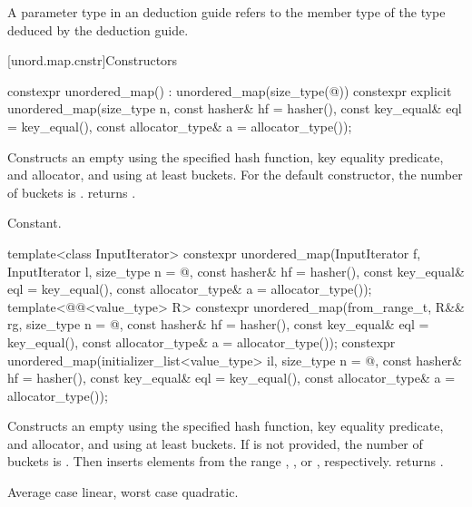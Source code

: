 \pnum
A  parameter type in an  deduction guide
refers to the  member type of the type deduced by the deduction guide.

[unord.map.cnstr]{Constructors}

%
\begin{itemdecl}
constexpr unordered_map() : unordered_map(size_type(@\seebelow@)) { }
constexpr explicit unordered_map(size_type n, const hasher& hf = hasher(),
                                 const key_equal& eql = key_equal(),
                                 const allocator_type& a = allocator_type());
\end{itemdecl}

\begin{itemdescr}
\pnum
\effects
Constructs an empty  using the
specified hash function, key equality predicate, and allocator, and
using at least  buckets.  For the default constructor,
the number of buckets is .
 returns .

\pnum
\complexity
Constant.
\end{itemdescr}

%
\begin{itemdecl}
template<class InputIterator>
  constexpr unordered_map(InputIterator f, InputIterator l,
                          size_type n = @\seebelow@, const hasher& hf = hasher(),
                          const key_equal& eql = key_equal(),
                          const allocator_type& a = allocator_type());
template<@@<value_type> R>
  constexpr unordered_map(from_range_t, R&& rg,
                          size_type n = @\seebelow@, const hasher& hf = hasher(),
                          const key_equal& eql = key_equal(),
                          const allocator_type& a = allocator_type());
constexpr unordered_map(initializer_list<value_type> il,
                        size_type n = @\seebelow@, const hasher& hf = hasher(),
                        const key_equal& eql = key_equal(),
                        const allocator_type& a = allocator_type());
\end{itemdecl}

\begin{itemdescr}
\pnum
\effects
Constructs an empty  using the
specified hash function, key equality predicate, and allocator, and
using at least  buckets. If  is not
provided, the number of buckets is . Then
inserts elements from the range , , or ,
respectively.
 returns .

\pnum
\complexity
Average case linear, worst case quadratic.
\end{itemdescr}

